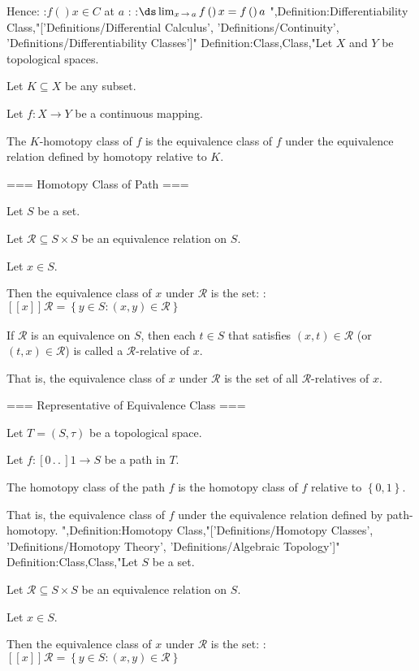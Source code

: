 Hence:
:$f \left(   \right)x \in C$ at $a$
:
:$\ds \lim_{x \mathop \to a} f \left(   \right)x = f \left(   \right)a$
",Definition:Differentiability Class,"['Definitions/Differential Calculus', 'Definitions/Continuity', 'Definitions/Differentiability Classes']"
Definition:Class,Class,"Let $X$ and $Y$ be topological spaces.

Let $K \subseteq X$ be any subset.

Let $f : X \to Y$ be a continuous mapping.

The $K$-homotopy class of $f$ is the equivalence class of $f$ under the equivalence relation defined by homotopy relative to $K$.


=== Homotopy Class of Path ===

Let $S$ be a set.

Let $\mathcal R \subseteq S \times S$ be an equivalence relation on $S$.

Let $x \in S$.


Then the equivalence class of $x$ under $\mathcal R$ is the set:
:$\left[\!\left[ x \right]\!\right]_{ }\mathcal R = \left\lbrace y \in S: \left( x, y \right) \in \mathcal R \right\rbrace$


If $\mathcal R$ is an equivalence on $S$, then each $t \in S$ that satisfies $\left( x, t \right) \in \mathcal R$ (or $\left( t, x \right) \in \mathcal R$) is called a $\mathcal R$-relative of $x$.


That is, the equivalence class of $x$ under $\mathcal R$ is the set of all $\mathcal R$-relatives of $x$.


=== Representative of Equivalence Class ===

Let $T = \left( S, \tau \right)$ be a topological space.

Let $f: \left[ 0 \,.\,.\,   \right]1 \to S$ be a path in $T$.


The homotopy class of the path $f$ is the homotopy class of $f$ relative to $\left\lbrace 0, 1 \right\rbrace$.


That is, the equivalence class of $f$ under the equivalence relation defined by path-homotopy.
",Definition:Homotopy Class,"['Definitions/Homotopy Classes', 'Definitions/Homotopy Theory', 'Definitions/Algebraic Topology']"
Definition:Class,Class,"Let $S$ be a set.

Let $\mathcal R \subseteq S \times S$ be an equivalence relation on $S$.

Let $x \in S$.


Then the equivalence class of $x$ under $\mathcal R$ is the set:
:$\left[\!\left[ x \right]\!\right]_{ }\mathcal R = \left\lbrace y \in S: \left( x, y \right) \in \mathcal R \right\rbrace$


